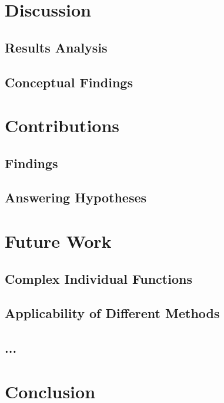 \section{Discussion}      

\subsection{Results Analysis}
\subsection{Conceptual Findings}

\section{Contributions} 

\subsection{Findings}
\subsection{Answering Hypotheses}


\section{Future Work}      

\subsection{Complex Individual Functions}
\subsection{Applicability of Different Methods}
\subsection{...}


\section{Conclusion}      


